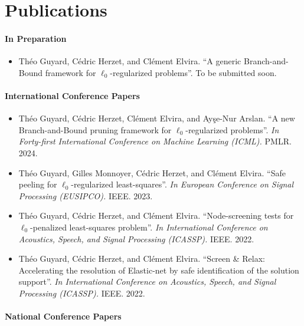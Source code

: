 \section{Publications}

\paragraph*{In Preparation}

\begin{itemize}[nosep]
    \item Théo Guyard, Cédric Herzet, and Clément Elvira. ``A generic Branch-and-Bound framework for $\ell_0$-regularized problems''. To be submitted soon.
\end{itemize}

\paragraph*{International Conference Papers}

\begin{itemize}
    \item Théo Guyard, Cédric Herzet, Clément Elvira, and Ay\c{s}e-Nur Arslan. ``A new Branch-and-Bound pruning framework for $\ell_0$-regularized problems''. \textit{In Forty-first International Conference on Machine Learning (ICML).} PMLR. 2024.
    \item Théo Guyard, Gilles Monnoyer, Cédric Herzet,  and Clément Elvira. ``Safe peeling for $\ell_0$-regularized least-squares''. \textit{In European Conference on Signal Processing (EUSIPCO).} IEEE. 2023.
    \item Théo Guyard, Cédric Herzet, and Clément Elvira. ``Node-screening tests for $\ell_0$-penalized least-squares problem''. \textit{In International Conference on Acoustics, Speech, and Signal Processing (ICASSP).} IEEE. 2022.
    \item Théo Guyard, Cédric Herzet, and Clément Elvira. ``Screen \& Relax: Accelerating the resolution of Elastic-net by safe identification of the solution support''. \textit{In International Conference on Acoustics, Speech, and Signal Processing (ICASSP).} IEEE. 2022.
\end{itemize}

\paragraph*{National Conference Papers}

